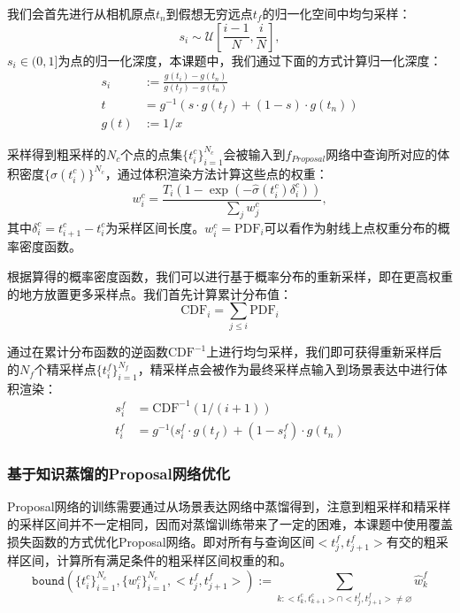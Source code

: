我们会首先进行从相机原点$t_n$到假想无穷远点$t_f$的归一化空间中均匀采样：
\begin{equation}
    s_i\sim\mathcal{U}\left[\frac{i-1}{N}, \frac{i}{N}\right],
\end{equation}
$s_i\in(0,1]$为点的归一化深度，本课题中，我们通过下面的方式计算归一化深度：
\begin{align}
    s_i&:=\frac{g(t_i)-g(t_n)}{g(t_f)-g(t_n)}\\
    t&=g^{-1}(s\cdot g(t_f) + (1-s)\cdot g(t_n))\\
    g(t)&:= 1/x
\end{align}

采样得到粗采样的$N_c$个点的点集$\{t_i^c\}_{i=1}^{N_c}$会被输入到$f_{Proposal}$网络中查询所对应的体积密度$\{\hat{\sigma}(t_i^c)\}^{N_c}$，通过体积渲染方法计算这些点的权重：
\begin{equation}
    w_i^c = \frac{T_i(1-\exp(-\hat{\sigma}(t_i^c)\delta_i^c))}{\sum_j w_j^c},
\end{equation}
其中$\delta_i^c = t_{i+1}^c - t_i^c$为采样区间长度。$w_i^c = \text{PDF}_i$可以看作为射线上点权重分布的概率密度函数。

根据算得的概率密度函数，我们可以进行基于概率分布的重新采样，即在更高权重的地方放置更多采样点。我们首先计算累计分布值：
\begin{equation}
    \text{CDF}_i = \sum_{j \leq i} \text{PDF}_i
\end{equation}

通过在累计分布函数的逆函数$\text{CDF}^{-1}$上进行均匀采样，我们即可获得重新采样后的$N_f$个精采样点$\{t_i^f\}_{i=1}^{N_f}$，精采样点会被作为最终采样点输入到场景表达中进行体积渲染：
\begin{align}
    s^f_i &= \text{CDF}^{-1}(1/(i + 1))\\
    t^f_i &= g^{-1}(s^f_i\cdot g(t_f) + (1-s^f_i)\cdot g(t_n)
\end{align}

\subsubsection{基于知识蒸馏的Proposal网络优化}

Proposal网络的训练需要通过从场景表达网络中蒸馏得到，注意到粗采样和精采样的采样区间并不一定相同，因而对蒸馏训练带来了一定的困难，本课题中使用覆盖损失函数的方式优化Proposal网络\cite{barron_mip-nerf_2022}。即对所有与查询区间$<t_{j}^f, t_{j+1}^f>$有交的粗采样区间，计算所有满足条件的粗采样区间权重的和。
\begin{equation}
    \mathtt{bound}(\{t_i^c\}_{i=1}^{N_c}, \{w_i^c\}_{i=1}^{N_c}, <t_{j}^f, t_{j+1}^f>) :=\sum_{k:<t_{k}^c,t_{k+1}^c>\cap<t_{j}^f, t_{j+1}^f>\neq\varnothing}\hat{w}_k^f
\end{equation}

